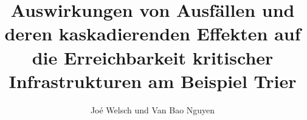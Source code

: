 
\title{Auswirkungen von Ausfällen und deren kaskadierenden Effekten auf die Erreichbarkeit kritischer Infrastrukturen am Beispiel Trier}
%
%

\author{Joé Welsch und Van Bao Nguyen}
%
%




%
\maketitle              %
%
